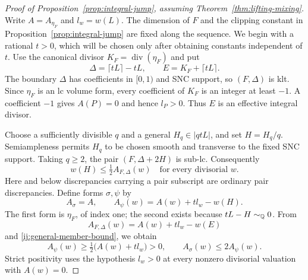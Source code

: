 \begin{proof}[Proof of Proposition~\ref{prop:integral-jump}, assuming
Theorem~\ref{thm:lifting-mixing}]
Write $A=A_{\eta_F}$ and $l_w=w(L)$.  The dimension of $F$ and the
clipping constant in Proposition~\ref{prop:integral-jump} are fixed
along the sequence.  We begin with a rational $t>0$, which will be
chosen only after obtaining constants independent of $t$.
Use the canonical divisor $K_F=\operatorname{div}(\eta_F)$ and put
\begin{equation}
\label{ij:adjoint-divisors}
 \Delta=\lceil tL\rceil-tL,
 \qquad E=K_F+\lceil tL\rceil.
\end{equation}
The boundary $\Delta$ has coefficients in $[0,1)$ and SNC support,
so $(F,\Delta)$ is klt.  Since $\eta_F$ is an lc volume form, every
coefficient of $K_F$ is an integer at least $-1$.  A coefficient
$-1$ gives $A(P)=0$ and hence $l_P>0$.  Thus $E$ is an effective
integral divisor.

Choose a sufficiently divisible $q$ and a general
$H_q\in|qtL|$, and set $H=H_q/q$.  Semiampleness permits $H_q$ to
be chosen smooth and transverse to the fixed SNC support.  Taking
$q\ge2$, the pair $(F,\Delta+2H)$ is sub-lc.  Consequently
\begin{equation}
\label{ij:general-member-bound}
 w(H)\le\tfrac12 A_{F,\Delta}(w)
 \quad\text{for every divisorial }w.
\end{equation}
Here and below discrepancies carrying a pair subscript are ordinary
pair discrepancies.  Define forms $\sigma,\psi$ by
\begin{equation}
\label{ij:two-forms}
 A_\sigma=A,
 \qquad A_\psi(w)=A(w)+t l_w-w(H).
\end{equation}
The first form is $\eta_F$, of index one; the second exists because
$tL-H\sim_{\mathbb Q}0$.  From
\[
 A_{F,\Delta}(w)=A(w)+t l_w-w(E)
\]
and \eqref{ij:general-member-bound}, we obtain
\begin{equation}
\label{ij:positive-anchor}
 A_\psi(w)\ge\tfrac12\bigl(A(w)+t l_w\bigr)>0,
 \qquad A_\sigma(w)\le2A_\psi(w).
\end{equation}
Strict positivity uses the hypothesis $l_w>0$ at every nonzero
divisorial valuation with $A(w)=0$.


\end{proof}
